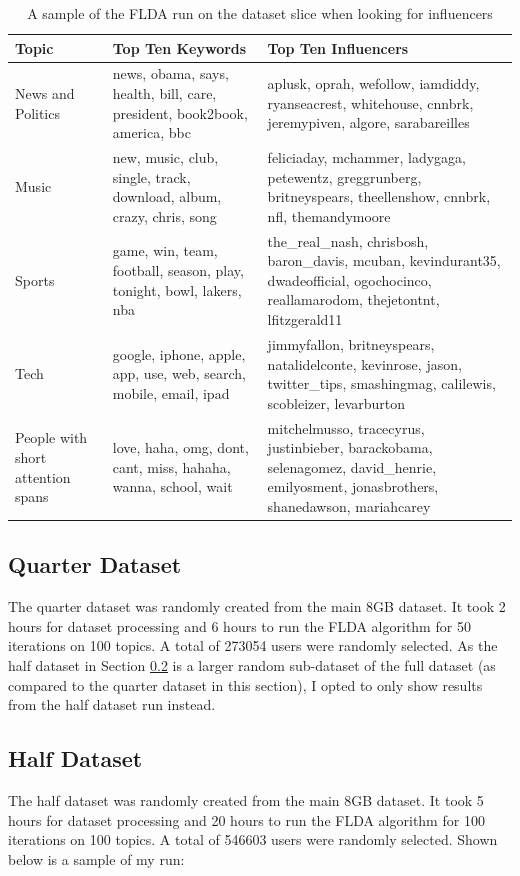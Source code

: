 \documentclass[a4paper]{article}
\begin{document}
\begin{table}[h]
  \centering %
  \begin{tabular}{ |l|l|l| }
    \hline
    Topic & Top Ten Keywords & Top Ten Influencers \\
    \hline
    \hline
    News and Politics & news, obama, says, health, bill, care, president, book2book, america, bbc & aplusk, oprah, wefollow, iamdiddy, ryanseacrest, whitehouse, cnnbrk, jeremypiven, algore, sarabareilles \\
    Music & new, music, club, single, track, download, album, crazy, chris, song & feliciaday, mchammer, ladygaga, petewentz, greggrunberg, britneyspears, theellenshow, cnnbrk, nfl, themandymoore \\
    Sports & game, win, team, football, season, play, tonight, bowl, lakers, nba & the\_real\_nash, chrisbosh, baron\_davis, mcuban, kevindurant35, dwadeofficial, ogochocinco, reallamarodom, thejetontnt, lfitzgerald11 \\
    Tech & google, iphone, apple, app, use, web, search, mobile, email, ipad & jimmyfallon, britneyspears, natalidelconte, kevinrose, jason, twitter\_tips, smashingmag, calilewis, scobleizer, levarburton \\
    People with short attention spans & love, haha, omg, dont, cant, miss, hahaha, wanna, school, wait & mitchelmusso, tracecyrus, justinbieber, barackobama, selenagomez, david\_henrie, emilyosment, jonasbrothers, shanedawson, mariahcarey \\
    \hline
  \end{tabular}
  \caption{A sample of the FLDA run on the dataset slice when looking for influencers}
  \label{tab:flda_test}
\end{table}

\subsection{Quarter Dataset}\label{sec:quarter}
The quarter dataset was randomly created from the main 8GB dataset. It took 2 hours for dataset processing and 6 hours to run the FLDA algorithm for 50 iterations on 100 topics. A total of 273054 users were randomly selected. As the half dataset in Section \ref{sec:half} is a larger random sub-dataset of the full dataset (as compared to the quarter dataset in this section), I opted to only show results from the half dataset run instead.

\subsection{Half Dataset}\label{sec:half}
The half dataset was randomly created from the main 8GB dataset. It took 5 hours for dataset processing and 20 hours to run the FLDA algorithm for 100 iterations on 100 topics. A total of 546603 users were randomly selected. Shown below is a sample of my run:
\end{document}
